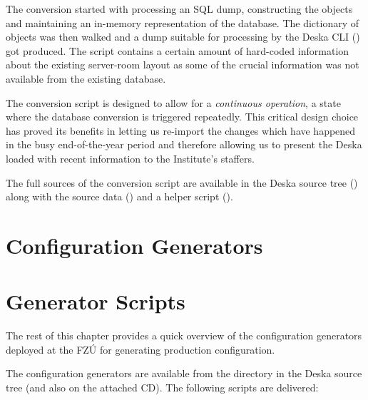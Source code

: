 \documentclass[deska]{subfiles}
\begin{document}
The conversion started with processing an SQL dump, constructing the objects and maintaining an in-memory representation
of the database.  The dictionary of objects was then walked and a dump suitable for processing by the Deska CLI
() got produced.  The script contains a certain amount of hard-coded information about the
existing server-room layout as some of the crucial information was not available from the existing database.

The conversion script is designed to allow for a {\em continuous operation}, a state where the database conversion is
triggered repeatedly.  This critical design choice has proved its benefits in letting us re-import the changes which
have happened in the busy end-of-the-year period and therefore allowing us to present the Deska loaded with recent
information to the Institute's staffers.

The full sources of the conversion script are available in the Deska source tree () along
with the source data () and a helper script ().

\section{Configuration Generators}
\label{sec:fzu-cfggen}

\section{Generator Scripts}

The rest of this chapter provides a quick overview of the configuration generators deployed at the FZÚ for generating
production configuration.

The configuration generators are available from the directory  in the Deska source tree
(and also on the attached CD).  The following scripts are delivered:
\end{document}
